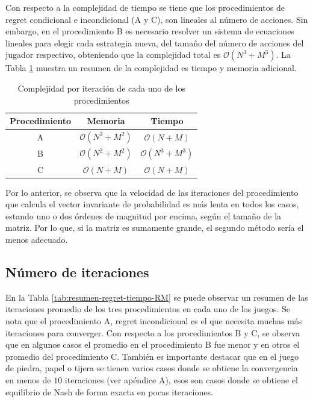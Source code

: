Con respecto a la complejidad de tiempo se tiene que los procedimientos de regret condicional e incondicional (A y C), son lineales al número de acciones. Sin embargo, en el procedimiento B es necesario resolver un sistema de ecuaciones lineales para elegir cada estrategia nueva, del tamaño del número de acciones del jugador respectivo, obteniendo que la complejidad total es $\mathcal{O}(N^3 + M^3)$. La Tabla \ref{tab:complejidades-iteraciones} muestra un resumen de la complejidad es tiempo y memoria adicional.

\begin{table}[ht]
    \centering
    \begin{tabular}{c c c}
        \hline
         Procedimiento & Memoria & Tiempo  \\ \hline
         A & $\mathcal{O}(N^2 + M^2)$ & $\mathcal{O}(N + M)$ \\ 
         B & $\mathcal{O}(N^2 + M^2)$ & $\mathcal{O}(N^3 + M^3)$ \\
         C & $\mathcal{O}(N + M)$     & $\mathcal{O}(N + M)$ \\ \hline
    \end{tabular}
    \caption{Complejidad por iteración de cada uno de los procedimientos}
    \label{tab:complejidades-iteraciones}
\end{table}

Por lo anterior, se observa que la velocidad de las iteraciones del procedimiento que calcula el vector invariante de probabilidad es más lenta en todos los casos, estando uno o dos órdenes de magnitud por encima, según el tamaño de la matriz. Por lo que, si la matriz es sumamente grande, el segundo método sería el menos adecuado.

\subsection{Número de iteraciones}

En la Tabla \ref{tab:resumen-regret-tiempo-RM} se puede observar un resumen de las iteraciones promedio de los tres procedimientos en cada uno de los juegos. Se nota que el procedimiento A, regret incondicional es el que necesita muchas más iteraciones para converger. Con respecto a los procedimientos B y C, se observa que en algunos casos el promedio en el procedimiento B fue menor y en otros el promedio del procedimiento C. También es importante destacar que en el juego de piedra, papel o tijera se tienen varios casos donde se obtiene la convergencia en menos de $10$ iteraciones (ver apéndice A), esos son casos donde se obtiene el equilibrio de Nash de forma exacta en pocas iteraciones.


